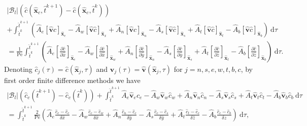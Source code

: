 \documentclass[preprint, 1p, authoryear]{elsarticle}
\begin{document}
\begin{multline*}
|\mathcal{B}_l| \left(\hat{c}(\hat{\mathbf{x}}_c, \hat{t}^{k+1}) - \hat{c}(\hat{\mathbf{x}}_c, \hat{t}^{k})\right)\\+
\int_{\hat{t}^{k}}^{\hat{t}^{k+1}} \left( \hat{A}_e \left[\hat{\mathbf{v}} \hat{c}\right]_{\hat{\mathbf{x}}_e } -\hat{A}_w \left[\hat{\mathbf{v}} \hat{c}\right]_{\hat{\mathbf{x}}_x } +\hat{A}_n \left[\hat{\mathbf{v}} \hat{c}\right]_{\hat{\mathbf{x}}_n } - \hat{A}_s\left[\hat{\mathbf{v}} \hat{c}\right]_{\hat{\mathbf{x}}_s } + \hat{A}_t\left[\hat{\mathbf{v}} \hat{c}\right]_{\hat{\mathbf{x}}_t} - \hat{A}_b \left[\hat{\mathbf{v}} \hat{c}\right]_{\hat{\mathbf{x}}_b } \right) \: \mathrm{d}\tau \\ = \frac{1}{\mathrm{Pe}} \int_{\hat{t}^{k}}^{\hat{t}^{k+1}} \left(\hat{A}_e\left[\frac{\partial \hat{c}}{\partial \hat{x}}\right]_{\hat{\mathbf{x}}_e } - \hat{A}_w \left[ \frac{\partial \hat{c}}{\partial \hat{x}}\right]_{\hat{\mathbf{x}}_w } +\hat{A}_n\left[ \frac{\partial \hat{c}}{\partial \hat{y}}\right]_{\hat{\mathbf{x}}_n } -\hat{A}_s \left[ \frac{\partial \hat{c}}{\partial \hat{y}}\right]_{\hat{\mathbf{x}}_s } +\hat{A}_t \left[ \frac{\partial \hat{c}}{\partial \hat{z}}\right]_{\hat{\mathbf{x}}_t } - \hat{A}_b\left[ \frac{\partial \hat{c}}{\partial \hat{z}}\right]_{\hat{\mathbf{x}}_b }\right) \: \mathrm{d}\tau.
\end{multline*}
Denoting $\hat{c}_j(\tau) = \hat{c}(\hat{\mathbf{x}}_j, \tau)$ and $\hat{\mathbf{v}}_j(\tau) = \hat{\mathbf{v}}(\hat{\mathbf{x}}_j, \tau)$ for 
$j=n,s,e,w,t,b,c$, by first order finite difference methods we have
\begin{multline}
|\mathcal{B}_l| \left( \hat{c}_c( \hat{t}^{k+1}) -\hat{c}_c( \hat{t}^{k})\right)+ 
\int_{\hat{t}^{k}}^{\hat{t}^{k+1}} \hat{A}_e\hat{\mathbf{v}}_e \hat{c}_e- \hat{A}_w \hat{\mathbf{v}}_w \hat{c}_w + \hat{A}_n \hat{\mathbf{v}}_n \hat{c}_n- \hat{A}_s \hat{\mathbf{v}}_s \hat{c}_s+ \hat{A}_t \hat{\mathbf{v}}_t \hat{c}_t- \hat{A}_b \hat{\mathbf{v}}_b \hat{c}_b \: \mathrm{d} \tau \\ = \int_{\hat{t}^{k}}^{\hat{t}^{k+1}} \frac{2}{\mathrm{Pe}} \left( \hat{A}_e \frac{\hat{c}_e -\hat{c}_c}{\delta \hat{x}} - \hat{A}_w\frac{\hat{c}_c-\hat{c}_w }{\delta \hat{x}} +\hat{A}_n \frac{\hat{c}_n - \hat{c}_c}{\delta \hat{y}} - \hat{A}_s \frac{\hat{c}_c-\hat{c}_s }{\delta \hat{y}} + \hat{A}_t \frac{\hat{c}_t - \hat{c}_c}{\delta \hat{z}} - \hat{A}_b\frac{\hat{c}_c-\hat{c}_b }{\delta \hat{z}}\right) \: \mathrm{d}\tau, \label{eq:Finite_Volume_Dis_1}
\end{multline}
\end{document}

